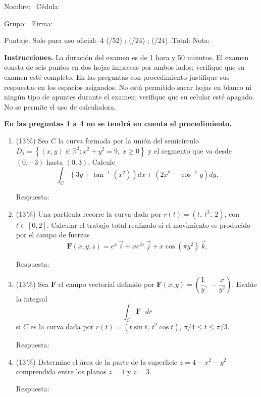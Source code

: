 \documentclass[11pt]{article}
\begin{document}
\examheader

\vspace{4pt}
\noindent Nombre: \dotfill\ Cédula: \dotfill

\vspace{4pt}
\noindent Grupo: \dotfill\ Firma: \dotfill

\vspace{4pt}
\noindent Puntaje. Solo para uso oficial:--4 (/52) \dotfill; (/24) \dotfill; (/24) \dotfill.\quad Total: \dotfill\quad Nota: \dotfill

\vspace{6pt}
\noindent\textbf{Instrucciones.} La duración del examen es de 1 hora y 50 minutos. El examen consta de seis puntos en dos hojas impresas por ambos lados; verifique que su examen esté completo. En las preguntas con procedimiento justifique sus respuestas en los espacios asignados. No está permitido sacar hojas en blanco ni ningún tipo de apuntes durante el examen; verifique que su celular esté apagado. No se permite el uso de calculadora.

\vspace{8pt}
\noindent\textbf{En las preguntas 1 a 4 no se tendrá en cuenta el procedimiento.}

\begin{enumerate}
\item{} (13\,\%) Sea $C$ la curva formada por la unión del semicírculo $D_1 = \left\{(x,y)\in\mathbb{R}^2 : x^2 + y^2 = 9,\ x \geq 0\right\}$ y el segmento que va desde $(0,-3)$ hasta $(0,3)$. Calcule
\[
\int_C \left(3y + \tan^{-1}(x^2)\right)dx + \left(2x^2 - \cos^{-1} y\right)dy.
\]

\vspace{2pt}
\noindent Respuesta: \underline{\phantom{XXXXXXXXXXXX}}

\item{} (13\,\%) Una partícula recorre la curva dada por $r(t) = (t,\ t^3,\ 2)$, con $t \in [0,2]$. Calcular el trabajo total realizado si el movimiento es producido por el campo de fuerzas
\[
\mathbf F(x,y,z) = e^x\,\vec i + xe^{3z}\,\vec j + x\cos(\pi y^2)\,\vec k.
\]

\vspace{2pt}
\noindent Respuesta: \underline{\phantom{XXXXXXXXXXXX}}

\item{} (13\,\%) Sea $\mathbf F$ el campo vectorial definido por $\mathbf F(x,y) = \left(\dfrac{1}{y},\ -\dfrac{x}{y^2}\right)$. Evalúe la integral
\[
\int_C \mathbf F \cdot dr
\]
si $C$ es la curva dada por $r(t) = (t\sin t,\ t^2\cos t)$, $\pi/4 \leq t \leq \pi/3$.

\vspace{2pt}
\noindent Respuesta: \underline{\phantom{XXXXXXXXXXXX}}

\item{} (13\,\%) Determine el área de la parte de la superficie $z = 4 - x^2 - y^2$ comprendida entre los planos $z = 1$ y $z = 3$.

\vspace{2pt}
\noindent Respuesta: \underline{\phantom{XXXXXXXXXXXX}}
\end{enumerate}
\end{document}

